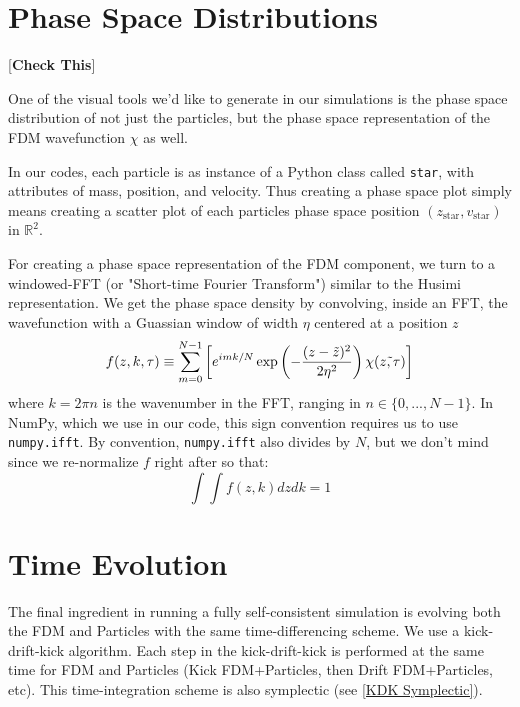 \documentclass[oneside]{book}
\begin{document}
\section{Phase Space Distributions}

{\color{red}
[\textbf{Check This}]}

One of the visual tools we'd like to generate in our simulations is the phase space distribution of not just the particles, but the phase space representation of the FDM wavefunction $\chi$ as well.

In our codes, each particle is as instance of a Python class called \texttt{star}, with attributes of mass, position, and velocity. Thus creating a phase space plot simply means creating a scatter plot of each particles phase space position $(z_\text{star},v_\text{star})$ in $\mathbb{R}^2$.

For creating a phase space representation of the FDM component, we turn to a windowed-FFT (or "Short-time Fourier Transform") similar to the Husimi representation. We get the phase space density by convolving, inside an FFT, the wavefunction with a Guassian window of width $\eta$ centered at a position $z$
\begin{equation}
    f(z,k,\tau) \equiv \large{\sum_{m = 0}^{N-1}} \left[e^{imk/N}\exp\left({-\frac{(z-\tilde{z})^2}{2\eta^2}}\right)\chi(\tilde{z,\tau})\right]
    \label{PhaseSpace FDM}
\end{equation}
where $k = 2\pi n$ is the wavenumber in the FFT, ranging in $n\in\{0,...,N-1\}$. In NumPy, which we use in our code, this sign convention requires us to use \texttt{numpy.ifft}. By convention, \texttt{numpy.ifft} also divides by $N$, but we don't mind since we re-normalize $f$ right after so that:
\begin{equation}
\int\int f(z,k) dzdk = 1
\end{equation}

\section{Time Evolution}

The final ingredient in running a fully self-consistent simulation is evolving both the FDM and Particles with the same time-differencing scheme. We use a kick-drift-kick algorithm. Each step in the kick-drift-kick is performed at the same time for FDM and Particles (Kick FDM+Particles, then Drift FDM+Particles, etc). This time-integration scheme is also symplectic (see \cref{KDK Symplectic}).
\end{document}
